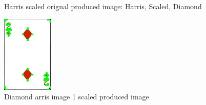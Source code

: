 \documentclass[conference]{IEEEtran}
\begin{document}
\begin{figure}[!htb]
\begin{minipage}[b]{0.2\textwidth}
    \caption{Harris scaled orignal produced image: Harris, Scaled, Diamond}
    \label{Harris scaled orignal produced image: Harris, scaled, Diamond}
  \end{minipage}
  \hfill
  \begin{minipage}[b]{0.2\textwidth}
    \includegraphics[width=\textwidth]{../programme/results/Task_1/scaled_experiements/Harris/diamond/image_1.jpg}
    \caption{Diamond arris image 1 scaled produced image}
    \label{Diamond harris image 1 scaled produced image}
  \end{minipage}
  \hfill
  \begin{minipage}[b]{0.2\textwidth}

\end{minipage}
\end{figure}
\end{document}

